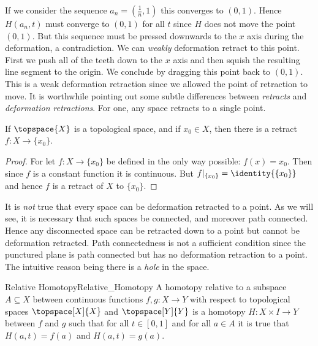 \documentclass{book}                                                           %
\begin{document}
                \par\vspace{2.5ex}
                If we consider the sequence $a_{n}=(\frac{1}{n},1)$ this
                converges to $(0,1)$. Hence $H(a_{n},t)$ must converge to
                $(0,1)$ for all $t$ since $H$ does not move the point $(0,1)$.
                But this sequence must be pressed downwards to the $x$ axis
                during the deformation, a contradiction. We can
                \textit{weakly} deformation retract to this point. First we push
                all of the teeth down to the $x$ axis and then squish the
                resulting line segment to the origin. We conclude by dragging
                this point back to $(0,1)$. This is a weak deformation
                retraction since we allowed the point of retraction to move.
                It is worthwhile pointing out some subtle differences between
                \textit{retracts} and \textit{deformation retractions}. For one,
                any space retracts to a single point.
                \begin{theorem}
                    If $\topspace{X}$ is a topological space, and if
                    $x_{0}\in{X}$, then there is a retract
                    $f:X\rightarrow\{x_{0}\}$.
                \end{theorem}
                \begin{proof}
                    For let $f:X\rightarrow\{x_{0}\}$ be defined in the only way
                    possible: $f(x)=x_{0}$. Then since $f$ is a constant
                    function it is continuous. But
                    $f|_{\{x_{0}\}}=\identity{\{x_{0}\}}$ and hence $f$ is a
                    retract of $X$ to $\{x_{0}\}$.
                \end{proof}
                It is \textit{not} true that every space can be deformation
                retracted to a point. As we will see, it is necessary that
                such spaces be connected, and moreover path connected. Hence any
                disconnected space can be retracted down to a point but cannot
                be deformation retracted. Path connectedness is not a sufficient
                condition since the punctured plane is path connected but has
                no deformation retraction to a point. The intuitive reason
                being there is a \textit{hole} in the space.
                \begin{fdefinition}{Relative Homotopy}{Relative_Homotopy}
                    A homotopy relative to a subspace $A\subseteq{X}$ between
                    continuous functions $f,g:X\rightarrow{Y}$ with respect to
                    topological spaces $\topspace[X]{X}$ and $\topspace[Y]{Y}$
                    is a homotopy $H:X\times{I}\rightarrow{Y}$ between $f$ and
                    $g$ such that for all $t\in[0,1]$ and for all $a\in{A}$ it
                    is true that $H(a,t)=f(a)$ and $H(a,t)=g(a)$.
                \end{fdefinition}
\end{document}
